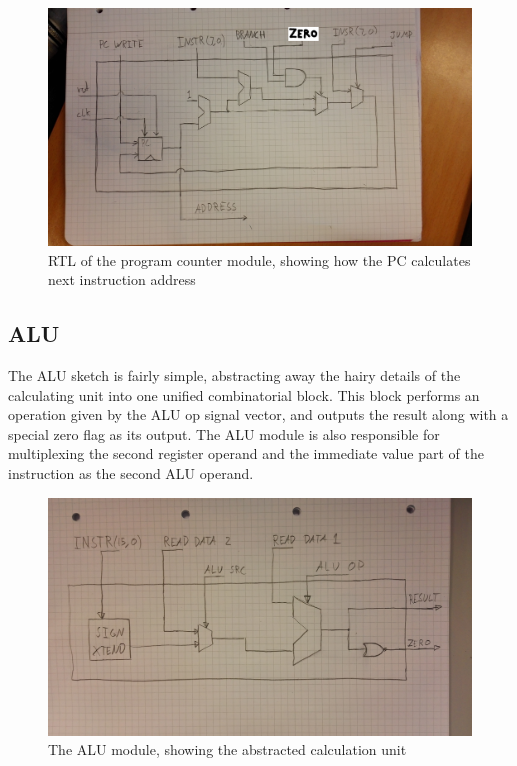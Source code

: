 \begin{figure}[h!]
    \includegraphics[width=\linewidth]{img/PC.jpg}
    \caption{RTL of the program counter module, showing how the PC calculates next instruction address}
    \label{fig:ProgramCounter}
\end{figure}

\subsection{ALU}

The ALU sketch is fairly simple, abstracting away the hairy details of the calculating unit into one unified combinatorial block.
This block performs an operation given by the ALU op signal vector, and outputs the result along with a special zero flag as its output.
The ALU module is also responsible for multiplexing the second register operand and the immediate value part of the instruction as the second ALU operand.

\begin{figure}[h!]
    \includegraphics[width=\linewidth]{img/ALU.jpg}
    \caption{The ALU module, showing the abstracted calculation unit}
    \label{fig:ALU}
\end{figure}

